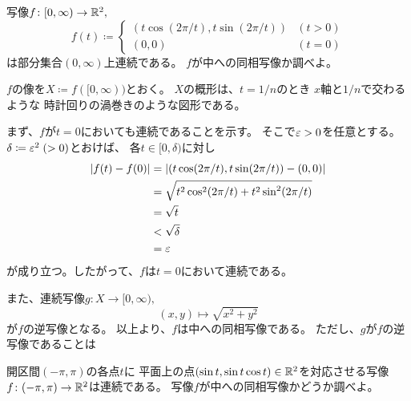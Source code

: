 \documentclass[report]{jlreq}
\begin{document}
\begin{problem}[幾何学II 1.9]
    写像$f \colon [0, \infty) \to \mathbb{R}^2,$
    \begin{equation}
        f(t) \coloneqq \begin{cases}
            (t \cos(2\pi / t), t \sin(2\pi / t)) & (t > 0) \\
            (0, 0) & (t = 0)
        \end{cases}
    \end{equation}
    は部分集合$(0, \infty)$上連続である。
    $f$が中への同相写像か調べよ。
\end{problem}

\begin{answer}
    $f$の像を$X \coloneqq f([0, \infty))$とおく。
    $X$の概形は、$t = 1/n$のとき
    $x$軸と$1/n$で交わるような
    時計回りの渦巻きのような図形である。

    まず、$f$が$t = 0$においても連続であることを示す。
    そこで$\varepsilon > 0$を任意とする。
    $\delta \coloneqq \varepsilon^2\; (> 0)$とおけば、
    各$t \in [0, \delta)$に対し
    \begin{alignat}{1}
        |f(t) - f(0)|
            &= |(t \cos(2\pi / t), t \sin(2\pi / t)) - (0, 0)| \\
            &= \sqrt{t^2 \cos^2(2\pi / t) + t^2 \sin^2(2\pi / t)} \\
            &= \sqrt{t} \\
            &< \sqrt{\delta} \\
            &= \varepsilon
    \end{alignat}
    が成り立つ。したがって、$f$は$t = 0$において連続である。

    また、連続写像$g \colon X \to [0, \infty),$
    \begin{equation}
        (x, y) \mapsto \sqrt{x^2 + y^2}
    \end{equation}
    が$f$の逆写像となる。
    以上より、$f$は中への同相写像である。
    ただし、$g$が$f$の逆写像であることは
    \TODO{}
\end{answer}

\begin{problem}[幾何学II 1.10]
    開区間$(-\pi, \pi)$の各点$t$に
    平面上の点$(\sin t, \sin t \cos t) \in \mathbb{R}^2$を対応させる写像
    $f \colon (-\pi, \pi) \to \mathbb{R}^2$は連続である。
    写像$f$が中への同相写像かどうか調べよ。
\end{problem}
\end{document}

